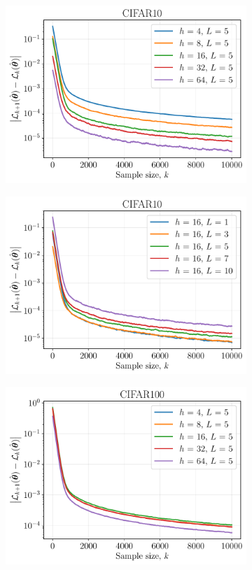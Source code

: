 \documentclass{article}
\begin{document}
\begin{figure}[ht]
\begin{subfigure}[b]{0.5\linewidth}
    \includegraphics[width=\linewidth]{figs_extraction/cifar10_hidden_size.pdf} 
  \end{subfigure}%
  \begin{subfigure}[b]{0.5\linewidth}
    \centering
    \includegraphics[width=\linewidth]{figs_extraction/cifar10_num_layers.pdf} 
  \end{subfigure} 
  \begin{subfigure}[b]{0.5\linewidth}
    \centering
    \includegraphics[width=\linewidth]{figs_extraction/cifar100_hidden_size.pdf} 

\end{subfigure}
\end{figure}
\end{document}
